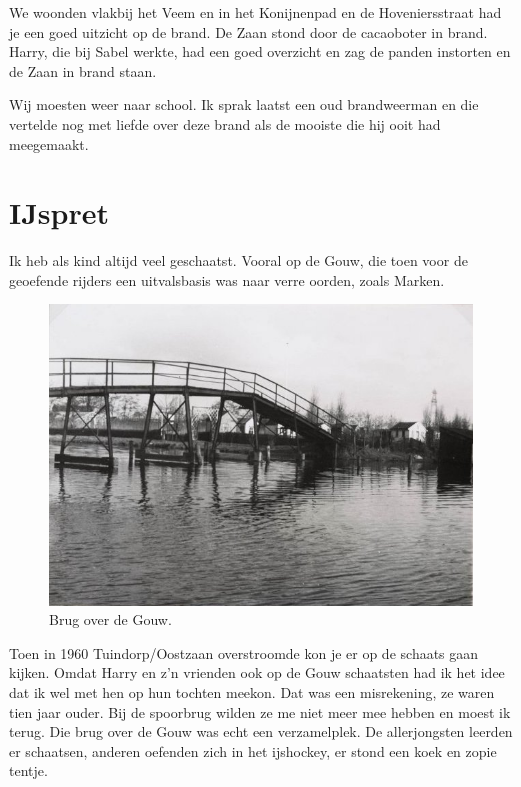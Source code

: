 \documentclass[12pt,twoside, openright]{memoir}
\begin{document}

We woonden vlakbij het Veem en in het Konijnenpad en de Hoveniersstraat had je een goed uitzicht op de brand. De Zaan stond door de cacaoboter in brand. Harry, die bij Sabel werkte, had een goed overzicht en zag de panden instorten en de Zaan in brand staan.

Wij moesten weer naar school. Ik sprak laatst een oud brandweerman en die vertelde nog met liefde over deze brand als de mooiste die hij ooit had meegemaakt. 

\section*{IJspret} %
\label{cha:ijspret}

Ik heb als kind altijd veel geschaatst. Vooral op de Gouw, die toen voor de geoefende rijders een uitvalsbasis was naar verre oorden, zoals Marken.

\begin{figure}
\centering
\includegraphics[width=\textwidth]{img/84bruggouw}
\caption*{\footnotesize Brug over de Gouw.}
\end{figure}

Toen in 1960 Tuindorp/Oostzaan overstroomde kon je er op de schaats gaan kijken. Omdat Harry en z’n vrienden ook op de Gouw schaatsten had ik het idee dat ik wel met hen op hun tochten meekon. Dat was een misrekening, ze waren tien jaar ouder. Bij de spoorbrug wilden ze me niet meer mee hebben en moest ik terug. Die brug over de Gouw was echt een verzamelplek. De allerjongsten leerden er schaatsen, anderen oefenden zich in het ijshockey, er stond een koek en zopie tentje.
\end{document}

